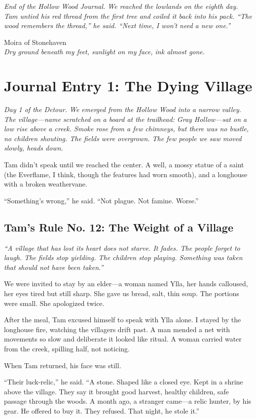 \documentclass[11pt]{article}
\begin{document}
\vspace{2em}
\textit{End of the Hollow Wood Journal. We reached the lowlands on the eighth day. Tam untied his red thread from the first tree and coiled it back into his pack. ``The wood remembers the thread,'' he said. ``Next time, I won't need a new one.''}

\noindent Moira of Stonehaven\\
\textit{Dry ground beneath my feet, sunlight on my face, ink almost gone.}

\section*{Journal Entry 1: The Dying Village}
\textit{Day 1 of the Detour. We emerged from the Hollow Wood into a narrow valley. The village---name scratched on a board at the trailhead: \textit{Gray Hollow}---sat on a low rise above a creek. Smoke rose from a few chimneys, but there was no bustle, no children shouting. The fields were overgrown. The few people we saw moved slowly, heads down.}

Tam didn't speak until we reached the center. A well, a mossy statue of a saint (the Everflame, I think, though the features had worn smooth), and a longhouse with a broken weathervane.

``Something's wrong,'' he said. ``Not plague. Not famine. Worse.''

\subsection*{Tam's Rule No. 12: The Weight of a Village}
\textit{``A village that has lost its heart does not starve. It fades. The people forget to laugh. The fields stop yielding. The children stop playing. Something was taken that should not have been taken.''}

We were invited to stay by an elder---a woman named Ylla, her hands calloused, her eyes tired but still sharp. She gave us bread, salt, thin soup. The portions were small. She apologized twice.

After the meal, Tam excused himself to speak with Ylla alone. I stayed by the longhouse fire, watching the villagers drift past. A man mended a net with movements so slow and deliberate it looked like ritual. A woman carried water from the creek, spilling half, not noticing.

When Tam returned, his face was still.

``Their luck-relic,'' he said. ``A stone. Shaped like a closed eye. Kept in a shrine above the village. They say it brought good harvest, healthy children, safe passage through the woods. A month ago, a stranger came---a relic hunter, by his gear. He offered to buy it. They refused. That night, he stole it.''
\end{document}
